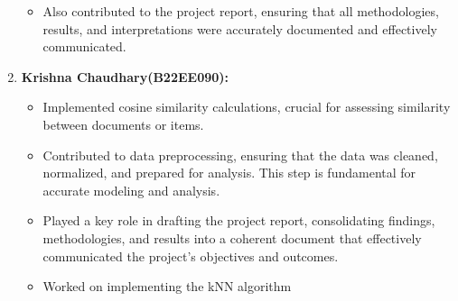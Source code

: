 \documentclass[a4paper]{article}
\theoremstyle{plain}
\theoremstyle{definition}
\begin{document}
\begin{enumerate}
\begin{itemize}
            \item    Also contributed to the project report, ensuring that all methodologies, results, and interpretations were accurately documented and effectively communicated.

        \end{itemize}
    \item \textbf{\large Krishna Chaudhary(B22EE090):} \begin{itemize}
        \item   Implemented cosine similarity calculations, crucial for assessing similarity between documents or items.
        \item Contributed to data preprocessing, ensuring that the data was cleaned, normalized, and prepared for analysis. This step is fundamental for accurate modeling and analysis.
        \item   Played a key role in drafting the project report, consolidating findings, methodologies, and results into a coherent document that effectively communicated the project's objectives and outcomes.
        \item  Worked on implementing the kNN algorithm
    \end{itemize}
	
	\end{enumerate}
    	
	
\end{document}
